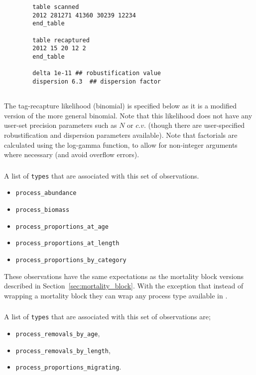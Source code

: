 {{{{{{\begin{verbatim}
		table scanned
		2012 281271 41360 30239 12234
		end_table
		
		table recaptured
		2012 15 20 12 2
		end_table
		
		delta 1e-11 ## robustification value
		dispersion 6.3	## dispersion factor
		
		\end{verbatim}}}



The tag-recapture likelihood (binomial) is specified below as it is a modified version of the more general binomial. Note that this likelihood does not have any user-set precision parameters such as $N$ or $c.v.$ (though there are user-specified robustification and dispersion parameters available). Note that factorials are calculated using the log-gamma function, to allow for non-integer arguments where necessary (and avoid overflow errors).


\subsubsection{}
A list of \texttt{types} that are associated with this set of observations.
\begin{itemize}
	\item \texttt{process\_abundance}
	\item \texttt{process\_biomass}
	\item \texttt{process\_proportions\_at\_age}
	\item \texttt{process\_proportions\_at\_length}	
	\item \texttt{process\_proportions\_by\_category}				
\end{itemize}

These observations have the same expectations as the mortality block versions described in Section~\ref{sec:mortality_block}. With the exception that instead of wrapping a mortality block they can wrap any process type available in \CNAME.

\subsubsection{}
A list of \texttt{types} that are associated with this set of observations are;
\begin{itemize}
	\item \texttt{process\_removals\_by\_age},
	\item \texttt{process\_removals\_by\_length},
	\item \texttt{process\_proportions\_migrating}.	
\\\\	

\end{itemize}}}}}
